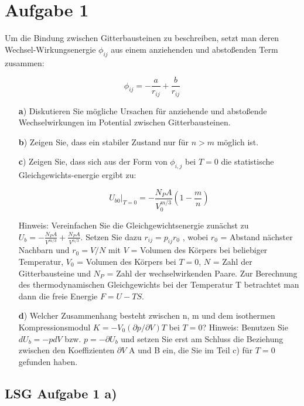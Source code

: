 



\section*{Aufgabe 1}

Um die Bindung zwischen Gitterbausteinen zu beschreiben, setzt man deren Wechsel-Wirkungsenergie $\phi_{ij}$ aus einem anziehenden und abstoßenden Term zusammen:

$$\phi_{ij}=-\frac{a}{r_{ij}}+\frac{b}{r_{ij}}$$

\begin{enumerate}
\item[\textbf{a})] Diskutieren Sie mögliche Ursachen für anziehende und abstoßende Wechselwirkungen im Potential zwischen Gitterbausteinen.
\item[\textbf{b})] Zeigen Sie, dass ein stabiler Zustand nur für $n > m$ möglich ist.
\item[\textbf{c})] Zeigen Sie, dass sich aus der Form von $\phi_{i,j}$ bei $T = 0$ die statistische Gleichgewichts-energie ergibt zu:

$$ \left. U_{b0}\right|_{T=0} = -\frac{N_P A}{V^{m/3}_0}(1-\frac{m}{n})$$

Hinweis: Vereinfachen Sie die Gleichgewichtsenergie zunächst zu $U_b=-\frac{N_PA}{V^{m/3}}+ \frac{N_PA}{V^{n/3}}$. Setzen Sie dazu $r_{ij} = p_{ij} r_0$ , wobei $r_0$ = Abstand nächster Nachbarn und $r_0 = V /N$ mit $V$ = Volumen des Körpers bei beliebiger Temperatur, $V_0$ = Volumen des Körpers bei $T=0$, $N$ = Zahl der Gitterbausteine und $N_P$ = Zahl der wechselwirkenden Paare. Zur Berechnung des thermodynamischen Gleichgewichts bei der Temperatur T betrachtet man dann die freie Energie $F=U-TS$.

\item[\textbf{d})] Welcher Zusammenhang besteht zwischen n, m und dem isothermen Kompressionsmodul $K = -V_0 (\partial p/\partial V )T$ bei $T = 0$? Hinweis: Benutzen Sie $dU_b = -pdV$ bzw. $p = -\partial U_b$ und setzen Sie erst am Schluss die Beziehung zwischen den Koeffizienten $\partial V$ A und B ein, die Sie im Teil c) für $T = 0$ gefunden haben.
\end{enumerate}





\subsection*{LSG Aufgabe 1 a)}

